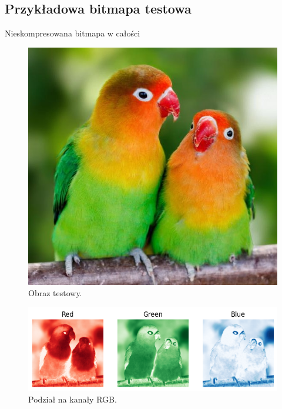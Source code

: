 \documentclass[11pt, leqno]{scrartcl}
\begin{document}
    \subsection{Przykładowa bitmapa testowa}
    Nieskompresowana bitmapa w całości
    \begin{figure}[H]
        \centering
        \includegraphics[width=0.5\linewidth]{../zad3/bird.jpg}
        \caption{Obraz testowy.}
    \end{figure}
    \begin{figure}[H]
        \centering
        \includegraphics[width=1\linewidth]{bird_channels.png}
        \caption{Podział na kanały RGB.}
    \end{figure}
\end{document}
